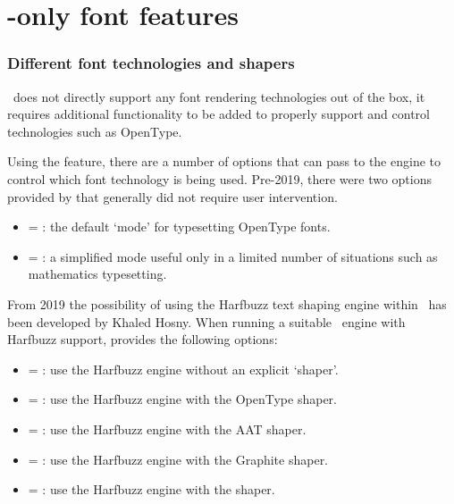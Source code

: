\documentclass[a4paper]{l3doc}
\begin{document}
\part{\LuaTeX-only font features}
\label{sec:luatex-features}

\section{Different font technologies and shapers}
\label{sec:renderer-luatex}

\LuaTeX\ does not directly support any font rendering technologies out of the box, it
requires additional functionality to be added to properly support and control technologies such as OpenType.

Using the  feature, there are a number of options that  can pass to the engine to control which font technology is being used.
Pre-2019, there were two options provided by  that generally did not require user intervention.

\begin{itemize}
\item {} =  : the default `mode' for typesetting OpenType fonts.
\item {} =  : a simplified mode useful only in a limited number of situations such as mathematics typesetting.
\end{itemize}

From 2019 the possibility of using the Harfbuzz text shaping engine within \LuaTeX\ has
been developed by Khaled Hosny. When running a suitable \LuaTeX\ engine with Harfbuzz support,  provides the following options:

\begin{itemize}
\item {} =  : use the Harfbuzz engine without an explicit `shaper'.
\item {} =  : use the Harfbuzz engine with the OpenType shaper.
\item {} =  : use the Harfbuzz engine with the AAT shaper.
\item {} =  : use the Harfbuzz engine with the Graphite shaper.
\item {} =  : use the Harfbuzz engine with the  shaper.
\end{itemize}
\end{document}

